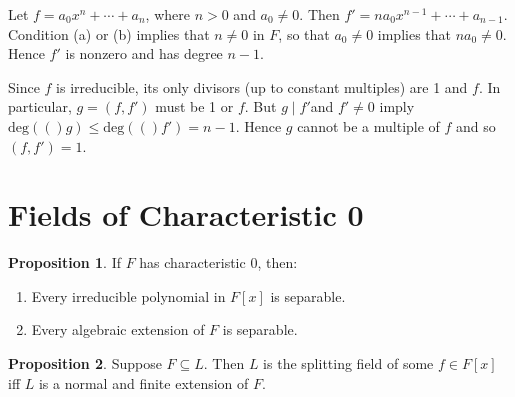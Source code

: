 \documentclass[leqno]{article}
\makeatletter
\newcommand{\deg}[1]{\text{deg}(#1)}
\theoremstyle{definition}
\newtheorem{prop}{Proposition}
\theoremstyle{remark}
\let\oldproofname=\proofname
\renewcommand{\proofname}{\textit{\oldproofname}}
\theoremstyle{definition}
\renewenvironment{proof}[1][\proofname]{\par
  \pushQED{\qed}%
  \normalfont \topsep6\p@\@plus6\p@\relax
  \list{}{\leftmargin=0mm
          \rightmargin=0mm
          \settowidth{\itemindent}{\itshape#1}%
          \labelwidth=\itemindent
          \parsep=0pt \listparindent=0mm%
  }
  \item[\hskip\labelsep
        \itshape
    #1\@addpunct{.}]\ignorespaces
}{%
  \popQED\endlist\@endpefalse
}
\makeatother
\begin{document}
        \begin{proof}
            Let $f=a_0x^n+\cdots+a_n$, where $n>0$ and $a_0\neq 0$. Then $f'=na_0x^{n-1}+\cdots+a_{n-1}$. Condition (a) or (b) implies that $n\neq 0$ in $F$, so that $a_0\neq 0$ implies that $na_0\neq 0$. Hence $f'$ is nonzero and has degree $n-1$.\par\hspace{4mm} Since $f$ is irreducible, its only divisors (up to constant multiples) are 1 and $f$. In particular, $g=(f,f')$ must be 1 or $f$. But $g\mid f'$and $f'\neq 0$ imply $\deg(g)\leq \deg(f')=n-1$. Hence $g$ cannot be a multiple of $f$ and so $(f,f')=1$.
        \end{proof}\newpage
\section{Fields of Characteristic 0}
    \begin{prop}
        If $F$ has characteristic 0, then:
            \begin{enumerate}[label=(\alph*)]
                \item Every irreducible polynomial in $F[x]$ is separable.
                \item Every algebraic extension of $F$ is separable.
            \end{enumerate}
    \end{prop}
    \begin{prop}
        Suppose $F\subseteq L$. Then $L$ is the splitting field of some $f\in F[x]$ iff $L$ is a normal and finite extension of $F$.
    \end{prop}\newpage
\end{document}
